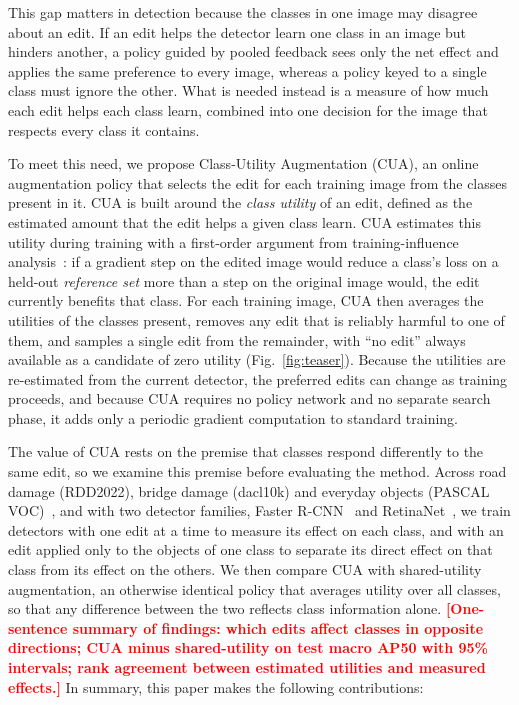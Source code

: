 \documentclass[conference]{IEEEtran}
\newcommand{\todo}[1]{\textcolor{red}{\textbf{[#1]}}}
\begin{document}
This gap matters in detection because the classes in one image may disagree about an edit. If an edit helps the detector learn one class in an image but hinders another, a policy guided by pooled feedback sees only the net effect and applies the same preference to every image, whereas a policy keyed to a single class must ignore the other. What is needed instead is a measure of how much each edit helps each class learn, combined into one decision for the image that respects every class it contains.

To meet this need, we propose Class-Utility Augmentation (CUA), an online augmentation policy that selects the edit for each training image from the classes present in it. CUA is built around the \emph{class utility} of an edit, defined as the estimated amount that the edit helps a given class learn. CUA estimates this utility during training with a first-order argument from training-influence analysis~\cite{pruthi2020tracin}: if a gradient step on the edited image would reduce a class's loss on a held-out \emph{reference set} more than a step on the original image would, the edit currently benefits that class. For each training image, CUA then averages the utilities of the classes present, removes any edit that is reliably harmful to one of them, and samples a single edit from the remainder, with ``no edit'' always available as a candidate of zero utility (Fig.~\ref{fig:teaser}). Because the utilities are re-estimated from the current detector, the preferred edits can change as training proceeds, and because CUA requires no policy network and no separate search phase, it adds only a periodic gradient computation to standard training.

The value of CUA rests on the premise that classes respond differently to the same edit, so we examine this premise before evaluating the method. Across road damage (RDD2022), bridge damage (dacl10k) and everyday objects (PASCAL VOC)~\cite{everingham2010voc}, and with two detector families, Faster R-CNN~\cite{ren2017faster} and RetinaNet~\cite{lin2017focal}, we train detectors with one edit at a time to measure its effect on each class, and with an edit applied only to the objects of one class to separate its direct effect on that class from its effect on the others. We then compare CUA with shared-utility augmentation, an otherwise identical policy that averages utility over all classes, so that any difference between the two reflects class information alone. \todo{One-sentence summary of findings: which edits affect classes in opposite directions; CUA minus shared-utility on test macro AP50 with 95\% intervals; rank agreement between estimated utilities and measured effects.} In summary, this paper makes the following contributions:
\end{document}
